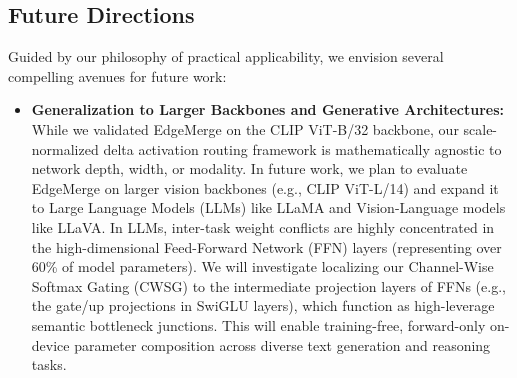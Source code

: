 \subsection{Future Directions}
Guided by our philosophy of practical applicability, we envision several compelling avenues for future work:
\begin{itemize}
    \item \textbf{Generalization to Larger Backbones and Generative Architectures:} While we validated EdgeMerge on the CLIP ViT-B/32 backbone, our scale-normalized delta activation routing framework is mathematically agnostic to network depth, width, or modality. In future work, we plan to evaluate EdgeMerge on larger vision backbones (e.g., CLIP ViT-L/14) and expand it to Large Language Models (LLMs) like LLaMA and Vision-Language models like LLaVA. In LLMs, inter-task weight conflicts are highly concentrated in the high-dimensional Feed-Forward Network (FFN) layers (representing over 60\% of model parameters). We will investigate localizing our Channel-Wise Softmax Gating (CWSG) to the intermediate projection layers of FFNs (e.g., the gate/up projections in SwiGLU layers), which function as high-leverage semantic bottleneck junctions. This will enable training-free, forward-only on-device parameter composition across diverse text generation and reasoning tasks.


\end{itemize}

